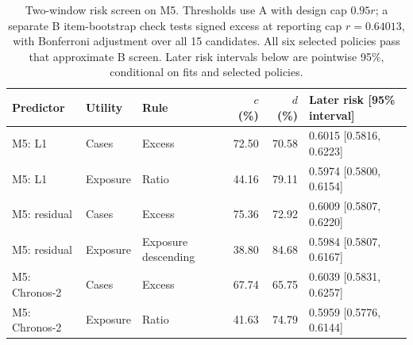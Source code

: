 \begin{table}[t]
\centering\small
\caption{Two-window risk screen on M5. Thresholds use A with design cap $0.95r$; a separate B item-bootstrap check tests signed excess at reporting cap $r=0.64013$, with Bonferroni adjustment over all 15 candidates. All six selected policies pass that approximate B screen. Later risk intervals below are pointwise 95\%, conditional on fits and selected policies.}
\label{tab:policy-screen}
\begin{tabular}{lllrrl}
\toprule
Predictor & Utility & Rule & $c$ (\%) & $d$ (\%) & Later risk [95\% interval] \\
\midrule
M5: L1 & Cases & Excess & 72.50 & 70.58 & 0.6015 [0.5816, 0.6223] \\
M5: L1 & Exposure & Ratio & 44.16 & 79.11 & 0.5974 [0.5800, 0.6154] \\
M5: residual & Cases & Excess & 75.36 & 72.92 & 0.6009 [0.5807, 0.6220] \\
M5: residual & Exposure & Exposure descending & 38.80 & 84.68 & 0.5984 [0.5807, 0.6167] \\
M5: Chronos-2 & Cases & Excess & 67.74 & 65.75 & 0.6039 [0.5831, 0.6257] \\
M5: Chronos-2 & Exposure & Ratio & 41.63 & 74.79 & 0.5959 [0.5776, 0.6144] \\
\bottomrule
\end{tabular}
\end{table}
